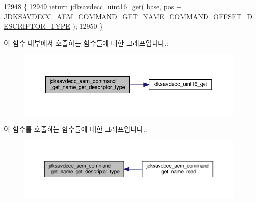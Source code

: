 \begin{DoxyCode}
12948 \{
12949     \textcolor{keywordflow}{return} \hyperlink{group__endian_ga3fbbbc20be954aa61e039872965b0dc9}{jdksavdecc\_uint16\_get}( base, pos + 
      \hyperlink{group__command__get__name_ga712329e89d6b6ca6b96759b6f9bf434b}{JDKSAVDECC\_AEM\_COMMAND\_GET\_NAME\_COMMAND\_OFFSET\_DESCRIPTOR\_TYPE}
       );
12950 \}
\end{DoxyCode}


이 함수 내부에서 호출하는 함수들에 대한 그래프입니다.\+:
\nopagebreak
\begin{figure}[H]
\begin{center}
\leavevmode
\includegraphics[width=350pt]{group__command__get__name_ga70f53d4ed25080ab3cc3934fb9946f86_cgraph}
\end{center}
\end{figure}




이 함수를 호출하는 함수들에 대한 그래프입니다.\+:
\nopagebreak
\begin{figure}[H]
\begin{center}
\leavevmode
\includegraphics[width=350pt]{group__command__get__name_ga70f53d4ed25080ab3cc3934fb9946f86_icgraph}
\end{center}
\end{figure}


